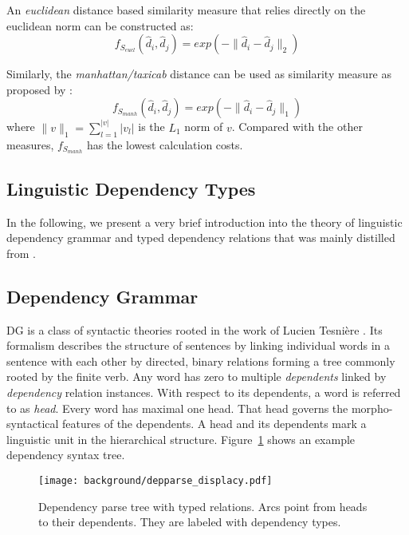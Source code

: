 An \textit{euclidean} distance based similarity measure that relies directly on the euclidean norm can be constructed as:
\begin{equation}
f_{S_{eucl}}(\hat{d}_i, \hat{d}_j) = exp(-\lVert\hat{d}_i - \hat{d}_j\rVert_2)
\end{equation}


Similarly, the \textit{manhattan/taxicab} distance can be used as similarity measure as proposed by \textcite{mueller_siamese_2016}:
\begin{equation}
f_{S_{manh}}(\hat{d}_i, \hat{d}_j) = exp(-\lVert\hat{d}_i - \hat{d}_j\rVert_1)
\end{equation}
where $\lVert v\rVert_1 = \sum\limits_{l=1}^{|v|}|v_l|$ is the $L_1$ norm of $v$. Compared with the other measures, $f_{S_{manh}}$ has the lowest calculation costs. %

\subsection{Linguistic Dependency Types}
In the following, we present a very brief introduction into the theory of linguistic dependency grammar and typed dependency relations that was mainly distilled from \textcite{jurafsky_dependency_2014}.

\subsection{Dependency Grammar}
\ac{DG} is a class of syntactic theories rooted in the work of Lucien Tesni\`{e}re \autocite{tesniere_elements_1976}. Its formalism describes the structure of sentences by linking individual words in a sentence with each other by directed, binary relations forming a tree commonly rooted by the finite verb. Any word has zero to multiple \textit{dependents} linked by \textit{dependency} relation instances. With respect to its dependents, a word is referred to as \textit{head}. Every word has maximal one head. That head governs the morpho-syntactical features of the dependents. A head and its dependents mark a linguistic unit in the hierarchical structure. Figure~\ref{fig:displacy_deps} shows an example dependency syntax tree.

\begin{figure}[htb!]
  \centering
  \texttt{[image: background/depparse\_displacy.pdf]}
  \caption{Dependency parse tree with typed relations. Arcs point from heads to their dependents. They are labeled with dependency types.}
  \label{fig:displacy_deps}
 \end{figure}


